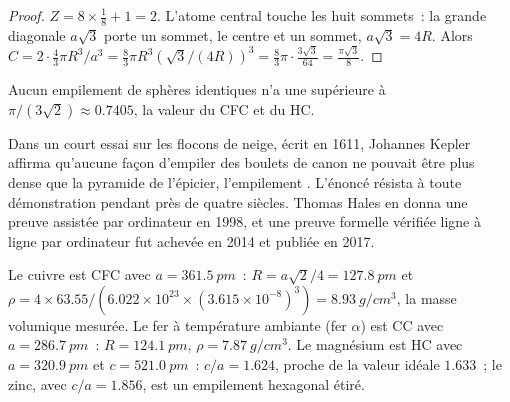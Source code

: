\begin{proof}
$Z = 8 \times \frac18 + 1 = 2$. L'atome central touche les huit sommets~:
la grande diagonale $a\sqrt3$ porte un sommet, le centre et un sommet,
$a\sqrt3 = 4R$. Alors $C = 2 \cdot \frac43\pi R^3/a^3 =
\frac83\pi R^3 (\sqrt3/(4R))^3 = \frac83\pi \cdot \frac{3\sqrt3}{64} =
\frac{\pi\sqrt3}{8}$.
\end{proof}

\begin{proposition}\label{prop:b1:crystals-metals:kepler}
Aucun empilement de sphères identiques n'a une  supérieure à
$\pi/(3\sqrt2) \approx 0.7405$, la valeur du CFC et du HC.
\end{proposition}
\admitted

\begin{history}
Dans un court essai sur les flocons de neige, écrit en 1611, Johannes
Kepler affirma qu'aucune façon d'empiler des boulets de canon ne pouvait
être plus dense que la pyramide de l'épicier, l'empilement . L'énoncé résista à toute démonstration pendant près de
quatre siècles. Thomas Hales en donna une preuve assistée par ordinateur
en 1998, et une preuve formelle vérifiée ligne à ligne par ordinateur
fut achevée en 2014 et publiée en 2017.
\end{history}

\begin{example}\label{ex:b1:crystals-metals:metals}
Le cuivre est CFC avec $a = \qty{361.5}{pm}$~: $R = a\sqrt2/4 =
\qty{127.8}{pm}$ et $\rho = 4 \times 63.55/(6.022 \times 10^{23} \times
(3.615 \times 10^{-8})^3) = \qty{8.93}{g/cm^3}$, la masse volumique
mesurée. Le fer à température ambiante (fer $\alpha$) est CC avec
$a = \qty{286.7}{pm}$~:
$R = \qty{124.1}{pm}$, $\rho = \qty{7.87}{g/cm^3}$. Le magnésium est HC
avec $a = \qty{320.9}{pm}$ et $c = \qty{521.0}{pm}$~: $c/a = 1.624$,
proche de la valeur idéale $1.633$~; le zinc, avec $c/a = 1.856$, est un
empilement hexagonal étiré.
\end{example}

